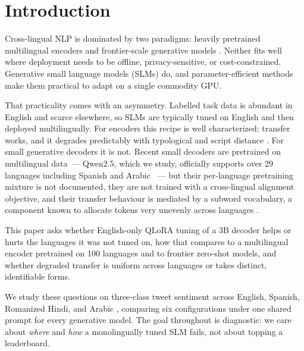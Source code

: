 \documentclass[11pt]{article}
\begin{document}
\section{Introduction}
\label{sec:introduction}

Cross-lingual NLP is dominated by two paradigms: heavily pretrained multilingual
encoders \citep{devlin2019bert,conneau2020xlmr} and frontier-scale generative
models \citep{meta2024llama3,geminiteam2025gemini}. Neither fits well where
deployment needs to be offline, privacy-sensitive, or cost-constrained. Generative
small language models (SLMs) do, and parameter-efficient methods
\citep{hu2022lora,dettmers2023qlora} make them practical to adapt on a single
commodity GPU.

That practicality comes with an asymmetry. Labelled task data is abundant in
English and scarce elsewhere, so SLMs are typically tuned on English and then
deployed multilingually. For encoders this recipe is well characterized: transfer
works, and it degrades predictably with typological and script distance
\citep{pires2019multilingual,wu2019beto,karthikeyan2020cross,hu2020xtreme}. For
small generative decoders it is not. Recent small decoders are pretrained on
multilingual data~--- Qwen2.5, which we study, officially supports over 29
languages including Spanish and Arabic \citep{qwen2025modelcard}~--- but their
per-language pretraining mixture is not documented, they are not trained with a
cross-lingual alignment objective, and their transfer behaviour is mediated by a
subword vocabulary, a component known to allocate tokens very unevenly across
languages \citep{rust2021good,petrov2023tokenizers,ahia2023cost}.

This paper asks whether English-only QLoRA tuning of a 3B decoder helps or hurts
the languages it was not tuned on, how that compares to a multilingual encoder
pretrained on 100 languages and to frontier zero-shot models, and whether degraded
transfer is uniform across languages or takes distinct, identifiable forms.

We study these questions on three-class tweet sentiment across English, Spanish,
Romanized Hindi, and Arabic \citep{barbieri2022xlmt}, comparing six configurations
under one shared prompt for every generative model. The goal throughout is
diagnostic: we care about \emph{where} and \emph{how} a monolingually tuned SLM
fails, not about topping a leaderboard.
\end{document}
